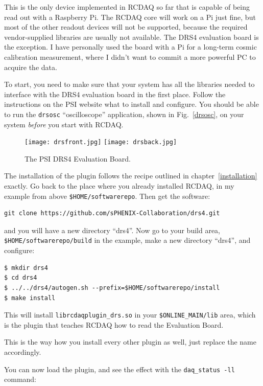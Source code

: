 \documentclass{article}[11pt]
\begin{document}
This is the only device implemented in RCDAQ so far that is capable of
being read out with a Raspberry Pi. The RCDAQ core will work on a Pi
just fine, but most of the other readout devices will not be
supported, because the required vendor-supplied libraries are usually
not available. The DRS4 evaluation board is the exception. I have
personally used the board with a Pi for a long-term cosmic calibration
measurement, where I didn't want to commit a more powerful PC to
acquire the data.

To start, you need to make sure that your system has all the libraries
needed to interface with the DRS4 evaluation board in the first
place. Follow the instructions on the PSI website what to install and
configure.  You should be able to run the \verb|drsosc|
``oscilloscope'' application, shown in Fig.~\ref{drsosc}, on your
system \emph{before} you start with RCDAQ.

\begin{figure}
  \centering
  \texttt{[image: drsfront.jpg]}
  \texttt{[image: drsback.jpg]}
  \caption{\label{drsevalboard}The PSI DRS4 Evaluation Board.}
\end{figure}

The installation of the plugin follows the recipe outlined in
chapter~\ref{installation} exactly. Go back to the place where you
already installed RCDAQ, in my example from above
\verb|$HOME/softwarerepo|. Then get the software:

\begin{verbatim}
git clone https://github.com/sPHENIX-Collaboration/drs4.git
\end{verbatim}

and you will have a new directory ``drs4''. Now go to your build area,
\verb|$HOME/softwarerepo/build| in the example, make a new directory ``drs4'',
and configure:

\begin{verbatim} 
$ mkdir drs4 
$ cd drs4 
$ ../../drs4/autogen.sh --prefix=$HOME/softwarerepo/install 
$ make install
\end{verbatim}

This will install \verb|librcdaqplugin_drs.so| in your
\verb|$ONLINE_MAIN/lib| area, which is the plugin that teaches RCDAQ how
to read the Evaluation Board.

This is the way how you install every other plugin as well, just
replace the name accordingly.

You can now load the plugin, and see the effect with the
\verb|daq_status -ll| command:
\end{document}
